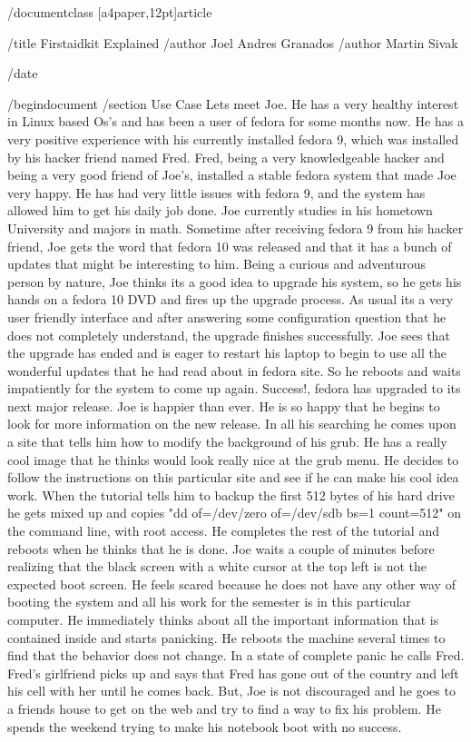 /documentclass [a4paper,12pt]{article}

/title{ Firstaidkit Explained }
/author{ Joel Andres Granados}
/author{ Martin Sivak }

/date {}

/begin{document}
/section{ Use Case }
Lets meet Joe.  He has a very healthy interest in Linux based Os's and has been a user of fedora for some months now.  He has a very positive experience with his currently installed fedora 9, which was installed by his hacker friend named Fred.  Fred, being a very knowledgeable hacker and being a very good friend of Joe's, installed a stable fedora system that made Joe very happy.  He has had very little issues with fedora 9, and the system has allowed him to get his daily job done.  Joe currently studies in his hometown University and majors in math.
Sometime after receiving fedora 9 from his hacker friend, Joe gets the word that fedora 10 was released and that it has a bunch of updates that might be interesting to him.  Being a curious and adventurous person by nature, Joe thinks its a good idea to upgrade his system, so he gets his hands on a fedora 10 DVD and fires up the upgrade process.  As usual its a very user friendly interface and after answering some configuration question that he does not completely understand, the upgrade finishes successfully.  Joe sees that the upgrade has ended and is eager to restart his laptop to begin to use all the wonderful updates that he had read about in fedora site.  So he reboots and waits impatiently for the system to come up again.
Success!, fedora has upgraded to its next major release.  Joe is happier than ever.  He is so happy that he begins to look for more information on the new release.  In all his searching he comes upon a site that tells him how to modify the background of his grub.  He has a really cool image that he thinks would look really nice at the grub menu.  He decides to follow the instructions on this particular site and see if he can make his cool idea work.  When the tutorial tells him to backup the first 512 bytes of his hard drive he gets mixed up and copies "dd of=/dev/zero of=/dev/sdb bs=1 count=512" on the command line, with root access.  He completes the rest of the tutorial and reboots when he thinks that he is done.
Joe waits a couple of minutes before realizing that the black screen with a white cursor at the top left is not the expected boot screen.  He feels scared because he does not have any other way of booting the system and all his work for the semester is in this particular computer.  He immediately thinks about all the important information that is contained inside and starts panicking.  He reboots the machine several times to find that the behavior does not change.  In a state of complete panic he calls Fred.  Fred's girlfriend picks up and says that Fred has gone out of the country and left his cell with her until he comes back.  But, Joe is not discouraged and he goes to a friends house to get on the web and try to find a way to fix his problem.  He spends the weekend trying to make his notebook boot with no success.
